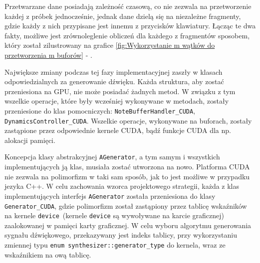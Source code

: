 Przetwarzane dane posiadają zależność czasową, co nie zezwala na przetworzenie każdej z próbek jednocześnie, jednak dane dzielą się na niezależne fragmenty, gdzie każdy z nich przypisane jest innemu z przycisków klawiatury. Łącząc te dwa fakty, możliwe jest zrównoleglenie obliczeń dla każdego z fragmentów sposobem, który został zilustrowany na grafice \ref{fig:Wykorzystanie m wątków do przetworzenia m buforów} - .

\vspace{10pt}Największe zmiany podczas tej fazy implementacyjnej zaszły w klasach odpowiedzialnych za generowanie dźwięku. Każda struktura, aby zostać przeniesiona na GPU, nie może posiadać żadnych metod. W związku z tym wszelkie operacje, które były wcześniej wykonywane w metodach, zostały przeniesione do klas pomocniczych: \texttt{NoteBufferHandler\_CUDA}, \texttt{DynamicsController\_CUDA}. Wszelkie operacje, wykonywane na buforach, zostały zastąpione przez odpowiednie kernele CUDA, bądź funkcje CUDA dla np. alokacji pamięci. 

\vspace{10pt}Koncepcja klasy abstrakcyjnej \texttt{AGenerator}, a tym samym i wszystkich implementujących ją klas, musiała zostać utworzona na nowo. Platforma CUDA\cite{bib:CUDA} nie zezwala na polimorfizm w taki sam sposób, jak to jest możliwe w przypadku jezyka C++. W celu zachowania wzorca projektowego strategii\cite{bib:DesignPatterns}, każda z klas implementujących interfejs \texttt{AGenerator} została przeniesiona do klasy \texttt{Generator\_CUDA}, gdzie polimorfizm został zastąpiony przez tablicę wskaźników na kernele \texttt{device}\ (kernele \texttt{device} są wywoływane na karcie graficznej) zaalokowanej w pamięci karty graficznej. W celu wyboru algorytmu generowania sygnału dźwiękowego, przekazywany jest indeks tablicy, przy wykorzystaniu zmiennej typu \texttt{enum synthesizer::generator\_type} do kernela, wraz ze wskaźnikiem na ową tablicę.

